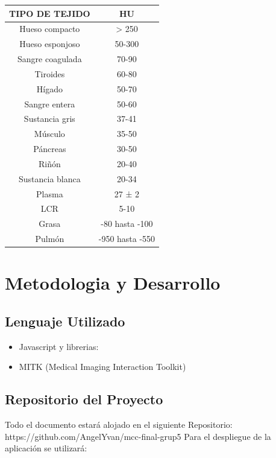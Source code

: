 \documentclass{article}
\begin{document}
\begin{table}[H]
\begin{center}
\begin{tabular}{| c | c |}
\hline
TIPO DE TEJIDO & HU \\ \hline
Hueso compacto & > 250 \\
Hueso esponjoso & 50-300 \\
Sangre coagulada & 70-90 \\
Tiroides & 60-80\\
Hígado & 50-70\\
Sangre entera & 50-60\\
Sustancia gris & 37-41\\
Músculo & 35-50\\
Páncreas & 30-50\\
Riñón & 20-40\\
Sustancia blanca & 20-34\\
Plasma & 27 ± 2\\
LCR & 5-10\\
Grasa & -80 hasta -100\\
Pulmón & -950 hasta -550\\ \hline
\end{tabular}
\end{center}
\end{table}


\section{Metodologia y Desarrollo}

\subsection{Lenguaje Utilizado}
\begin{itemize}
	\item Javascript y librerias:
	\item MITK (Medical Imaging Interaction Toolkit)
	\end{itemize}
	


\subsection{Repositorio del Proyecto}

Todo el documento estará alojado en el siguiente Repositorio: https://github.com/AngelYvan/mcc-final-grup5
Para el despliegue de la aplicación se utilizará: 
\end{document}
